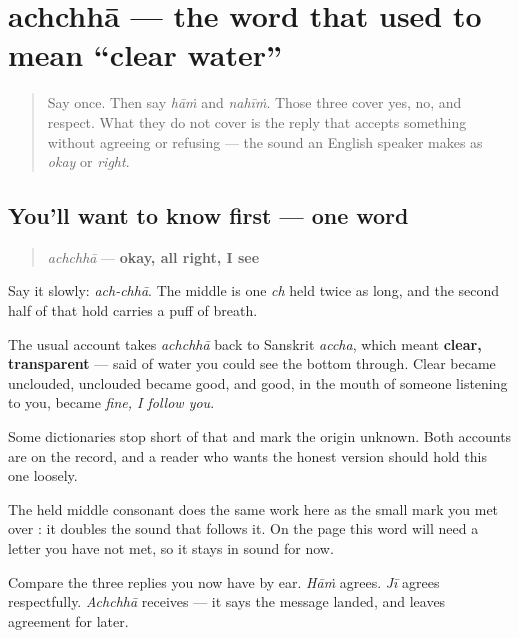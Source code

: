 \section[\texorpdfstring{\pa{ਅੱਛਾ} (achchhā)}{ਅੱਛਾ (achchhā)}]{achchhā — the word that used to mean \textquotedblleft{}clear water\textquotedblright{}}

\label{lesson:PA-C31-achchha}



\begin{quote}
Say \textbf{} once. Then say \emph{hāṁ} and \emph{nahīṁ}. Those three cover yes, no, and respect. What they do not cover is the reply that accepts something without agreeing or refusing — the sound an English speaker makes as \emph{okay} or \emph{right}.
\end{quote}

\subsection*{You'll want to know first — one word}
\begin{quote}
\emph{achchhā} — \textbf{okay, all right, I see}
\end{quote}

Say it slowly: \emph{ach-chhā}. The middle is one \emph{ch} held twice as long, and the second half of that hold carries a puff of breath.

\begin{cousinweb}
The usual account takes \emph{achchhā} back to Sanskrit \emph{accha}, which meant \textbf{clear, transparent} — said of water you could see the bottom through. Clear became unclouded, unclouded became good, and good, in the mouth of someone listening to you, became \emph{fine, I follow you}.

Some dictionaries stop short of that and mark the origin unknown. Both accounts are on the record, and a reader who wants the honest version should hold this one loosely.

The held middle consonant does the same work here as the small mark \textbf{} you met over \textbf{}: it doubles the sound that follows it. On the page this word will need a letter you have not met, so it stays in sound for now.

Compare the three replies you now have by ear. \emph{Hāṁ} agrees. \emph{Jī} agrees respectfully. \emph{Achchhā} receives — it says the message landed, and leaves agreement for later.
\end{cousinweb}

